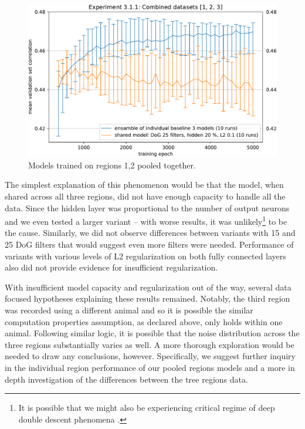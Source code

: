 \begin{figure}[H]
    \centering
    \includegraphics[width=1\textwidth]{../figures/05_3_1_1_2}
    \caption[Experiment 3.1.1 2]{Models trained on {regions 1,2} pooled together\protect\footnotemark.}
    \label{fig:5.3.1.1_2}
\end{figure}

The simplest explanation of this phenomenon would be that the model, when shared across all three regions, did not have enough capacity to handle all the data. Since the hidden layer was proportional to the number of output neurons and we even tested a larger variant -- with worse results, it was unlikely\footnote{It is possible that we might also be experiencing critical regime of deep double descent phenomena \citep{2019arXiv191202292N}.} to be the cause. Similarly, we did not observe differences between variants with 15 and 25 DoG filters that would suggest even more filters were needed. Performance of variants with various levels of L2 regularization on both fully connected layers also did not provide evidence for insufficient regularization. 

With insufficient model capacity and regularization out of the way, several data focused hypotheses explaining these results remained. Notably, the third region was recorded using a different animal and so it is possible the similar computation properties assumption, as declared above, only holds within one animal. Following similar logic, it is possible that the noise distribution across the three regions substantially varies as well. A more thorough exploration would be needed to draw any conclusions, however. Specifically, we suggest further inquiry in the individual region performance of our pooled regions models and a more in depth investigation of the differences between the tree regions data.

